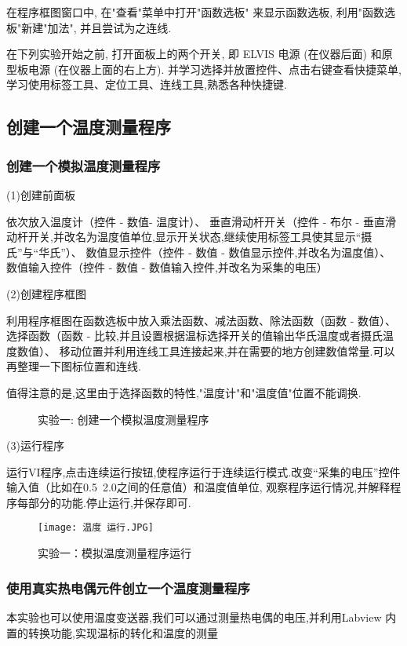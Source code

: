 \documentclass[11pt]{article}
\begin{document}
在程序框图窗口中, 
在"查看"菜单中打开"函数选板" 来显示函数选板, 
利用"函数选板"新建"加法", 并且尝试为之连线.

在下列实验开始之前, 
打开面板上的两个开关, 
即 ELVIS 电源 (在仪器后面) 和原型板电源 (在仪器上面的右上方).
并学习选择并放置控件、点击右键查看快捷菜单,学习使用标签工具、定位工具、连线工具,熟悉各种快捷键.

\subsection{创建一个温度测量程序}
\subsubsection{创建一个模拟温度测量程序}
(1)创建前面板

依次放入温度计（控件 - 数值- 温度计）、
垂直滑动杆开关（控件 - 布尔 - 垂直滑动杆开关,并改名为温度值单位,显示开关状态,继续使用标签工具使其显示“摄氏”与“华氏”）、
数值显示控件（控件 - 数值 - 数值显示控件,并改名为温度值）、
数值输入控件（控件 - 数值 - 数值输入控件,并改名为采集的电压）

(2)创建程序框图

利用程序框图在函数选板中放入乘法函数、减法函数、除法函数（函数 - 数值）、
选择函数（函数 - 比较,并且设置根据温标选择开关的值输出华氏温度或者摄氏温度数值）、
移动位置并利用连线工具连接起来,并在需要的地方创建数值常量.可以再整理一下图标位置和连线.

值得注意的是,这里由于选择函数的特性,"温度计"和"温度值"位置不能调换.

\begin{figure}[htb]
    \centering
    \hspace{0.5cm}
    \caption{实验一: 创建一个模拟温度测量程序}
\end{figure}

\newpage
(3)运行程序

运行VI程序,点击连续运行按钮,使程序运行于连续运行模式.改变“采集的电压”控件输入值（比如在0.5~2.0之间的任意值）和温度值单位,
观察程序运行情况,并解释程序每部分的功能.停止运行,并保存即可.
\begin{figure}[htbp]
    \centering
    \texttt{[image: 温度 运行.JPG]}
    \caption{实验一：模拟温度测量程序运行}
\end{figure}

\subsubsection{使用真实热电偶元件创立一个温度测量程序}
本实验也可以使用温度变送器,我们可以通过测量热电偶的电压,并利用Labview 内置的转换功能,实现温标的转化和温度的测量
\end{document}
